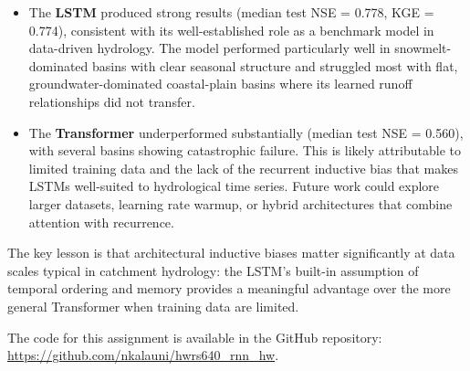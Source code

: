 \documentclass[11pt, letterpaper]{article}
\begin{document}
\begin{itemize}
    \item The \textbf{LSTM} produced strong results (median test NSE = 0.778,
          KGE = 0.774), consistent with its well-established role as a
          benchmark model in data-driven hydrology.  The model performed
          particularly well in snowmelt-dominated basins with clear seasonal
          structure and struggled most with flat, groundwater-dominated
          coastal-plain basins where its learned runoff relationships
          did not transfer.

    \item The \textbf{Transformer} underperformed substantially (median test
          NSE = 0.560), with several basins showing catastrophic failure.
          This is likely attributable to limited training data and the lack
          of the recurrent inductive bias that makes LSTMs well-suited to
          hydrological time series.  Future work could explore larger datasets,
          learning rate warmup, or hybrid architectures that combine attention
          with recurrence.
\end{itemize}

The key lesson is that architectural inductive biases matter significantly
at data scales typical in catchment hydrology: the LSTM's built-in assumption
of temporal ordering and memory provides a meaningful advantage over the
more general Transformer when training data are limited.

The code for this assignment is available in the GitHub repository:
\url{https://github.com/nkalauni/hwrs640_rnn_hw}.
\end{document}
